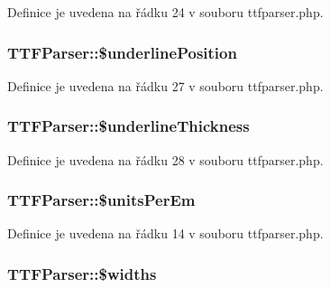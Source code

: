 Definice je uvedena na řádku 24 v souboru ttfparser.\-php.

\hypertarget{class_t_t_f_parser_aa5db12337eeb53a2a0e33071dbe69e98}{
\subsubsection[{\$underline\-Position}]{\setlength{\rightskip}{0pt plus 5cm}T\-T\-F\-Parser\-::\$underline\-Position}}\label{class_t_t_f_parser_aa5db12337eeb53a2a0e33071dbe69e98}


Definice je uvedena na řádku 27 v souboru ttfparser.\-php.

\hypertarget{class_t_t_f_parser_a676721af52dd3748c9e0fdbd3056883d}{
\subsubsection[{\$underline\-Thickness}]{\setlength{\rightskip}{0pt plus 5cm}T\-T\-F\-Parser\-::\$underline\-Thickness}}\label{class_t_t_f_parser_a676721af52dd3748c9e0fdbd3056883d}


Definice je uvedena na řádku 28 v souboru ttfparser.\-php.

\hypertarget{class_t_t_f_parser_a081eb1e34c96b94b279365e285d77ee3}{
\subsubsection[{\$units\-Per\-Em}]{\setlength{\rightskip}{0pt plus 5cm}T\-T\-F\-Parser\-::\$units\-Per\-Em}}\label{class_t_t_f_parser_a081eb1e34c96b94b279365e285d77ee3}


Definice je uvedena na řádku 14 v souboru ttfparser.\-php.

\hypertarget{class_t_t_f_parser_a2ee6956fd3f8df4ba30e222658e0bed3}{
\subsubsection[{\$widths}]{\setlength{\rightskip}{0pt plus 5cm}T\-T\-F\-Parser\-::\$widths}}\label{class_t_t_f_parser_a2ee6956fd3f8df4ba30e222658e0bed3}


